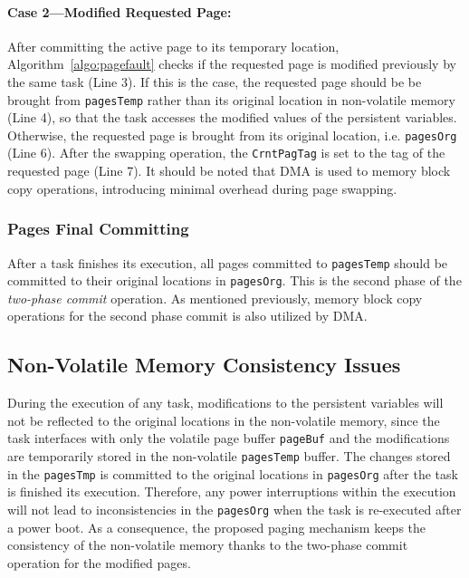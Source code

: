 \paragraph{Case 2---Modified Requested Page:} After committing the active page to its temporary location, Algorithm~\ref{algo:pagefault} checks if the requested page is modified previously by the same task (Line 3). If this is the case, the requested page should be be brought from \texttt{pagesTemp} rather than its original location in non-volatile memory (Line 4), so that the task accesses the modified values of the persistent variables. Otherwise, the requested page is brought from its original location, i.e. \texttt{pagesOrg} (Line 6). After the swapping operation, the \texttt{CrntPagTag} is set to the tag of the requested page (Line 7). It should be noted that DMA is used to memory block copy operations, introducing minimal overhead during page swapping. 

\subsubsection{Pages Final Committing}

After a task finishes its execution, all pages committed to \texttt{pagesTemp} should be committed to their original locations in \texttt{pagesOrg}. This is the second phase of the \emph{two-phase commit} operation. As mentioned previously, memory block copy operations for the second phase commit is also utilized by DMA.

\subsection{Non-Volatile Memory Consistency Issues}

During the execution of any task, modifications to the persistent variables will not be reflected to the original locations in the non-volatile memory, since the task interfaces with only the volatile page buffer \texttt{pageBuf} and the modifications are temporarily stored in the non-volatile \texttt{pagesTemp} buffer. The changes stored in the \texttt{pagesTmp} is committed to the original locations in \texttt{pagesOrg} after the task is finished its execution. Therefore, any power interruptions within the execution will not lead to inconsistencies in the \texttt{pagesOrg} when the task is re-executed after a power boot. As a consequence, the proposed paging mechanism keeps the consistency of the non-volatile memory thanks to the two-phase commit operation for the modified pages. 

